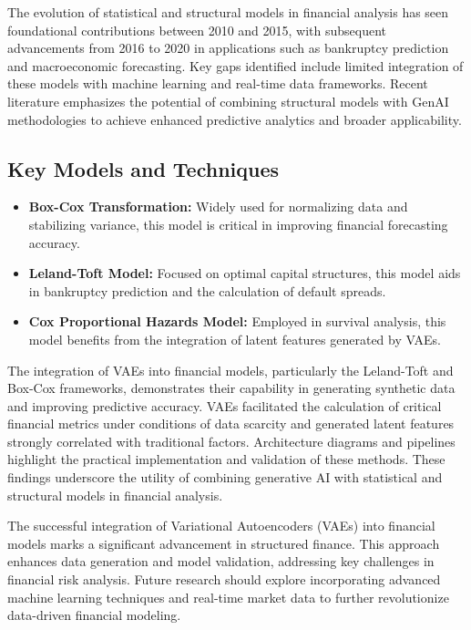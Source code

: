 \documentclass[a4paper,12pt]{scrbook}
\begin{document}
	The evolution of statistical and structural models in financial analysis has seen foundational contributions between 2010 and 2015, with subsequent advancements from 2016 to 2020 in applications such as bankruptcy prediction and macroeconomic forecasting. Key gaps identified include limited integration of these models with machine learning and real-time data frameworks. Recent literature emphasizes the potential of combining structural models with GenAI methodologies to achieve enhanced predictive analytics and broader applicability.
	
	\subsection{Key Models and Techniques}
	\begin{itemize}
		\item \textbf{Box-Cox Transformation:} Widely used for normalizing data and stabilizing variance, this model is critical in improving financial forecasting accuracy.
		\item \textbf{Leland-Toft Model:} Focused on optimal capital structures, this model aids in bankruptcy prediction and the calculation of default spreads.
		\item \textbf{Cox Proportional Hazards Model:} Employed in survival analysis, this model benefits from the integration of latent features generated by VAEs.
	\end{itemize}
	
	The integration of VAEs into financial models, particularly the Leland-Toft and Box-Cox frameworks, demonstrates their capability in generating synthetic data and improving predictive accuracy. VAEs facilitated the calculation of critical financial metrics under conditions of data scarcity and generated latent features strongly correlated with traditional factors. Architecture diagrams and pipelines highlight the practical implementation and validation of these methods. These findings underscore the utility of combining generative AI with statistical and structural models in financial analysis.
	
	The successful integration of Variational Autoencoders (VAEs) into financial models marks a significant advancement in structured finance. This approach enhances data generation and model validation, addressing key challenges in financial risk analysis. Future research should explore incorporating advanced machine learning techniques and real-time market data to further revolutionize data-driven financial modeling.
	
\end{document}
